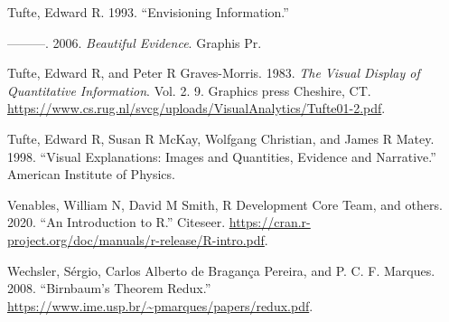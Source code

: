 \documentclass[
]{book}
\newlength{\cslhangindent}
\newenvironment{cslreferences}%
  {\setlength{\parindent}{0pt}%
  \everypar{\setlength{\hangindent}{\cslhangindent}}\ignorespaces}%
  {\par}
\theoremstyle{definition}
\theoremstyle{definition}
\theoremstyle{definition}
\theoremstyle{remark}
\begin{document}
\begin{cslreferences}
\leavevmode\hypertarget{ref-tufte1993envisioning}{}%
Tufte, Edward R. 1993. ``Envisioning Information.''

\leavevmode\hypertarget{ref-tufte2006beautiful}{}%
---------. 2006. \emph{Beautiful Evidence}. Graphis Pr.

\leavevmode\hypertarget{ref-tufte1983visual}{}%
Tufte, Edward R, and Peter R Graves-Morris. 1983. \emph{The Visual Display of Quantitative Information}. Vol. 2. 9. Graphics press Cheshire, CT. \url{https://www.cs.rug.nl/svcg/uploads/VisualAnalytics/Tufte01-2.pdf}.

\leavevmode\hypertarget{ref-tufte1998visual}{}%
Tufte, Edward R, Susan R McKay, Wolfgang Christian, and James R Matey. 1998. ``Visual Explanations: Images and Quantities, Evidence and Narrative.'' American Institute of Physics.

\leavevmode\hypertarget{ref-venables2020introduction}{}%
Venables, William N, David M Smith, R Development Core Team, and others. 2020. ``An Introduction to R.'' Citeseer. \url{https://cran.r-project.org/doc/manuals/r-release/R-intro.pdf}.

\leavevmode\hypertarget{ref-wechsler2008birnbaum}{}%
Wechsler, Sérgio, Carlos Alberto de Bragança Pereira, and P. C. F. Marques. 2008. ``Birnbaum's Theorem Redux.'' \url{https://www.ime.usp.br/~pmarques/papers/redux.pdf}.
\end{cslreferences}
\end{document}
